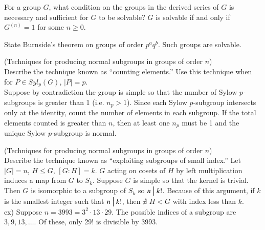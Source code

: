 \documentclass[avery5371,grid]{flashcards}
\newcommand{\divides}{\bigm|}
\begin{document}
\begin{flashcard}[Groups]{For a group $G$, what condition on the groups in the derived series of $G$ is necessary and sufficient for $G$ to be solvable?}
 $G$ is solvable if and only if $G^{(n)} = 1$ for some $n \geq 0$.
\end{flashcard}

\begin{flashcard}[Groups]{State Burnside's theorem on groups of order $p^aq^b$.}
 Such groups are solvable.
\end{flashcard}


\begin{flashcard}[Groups]{(Techniques for producing normal subgroups in groups of order $n$) \\ \vspace{5pt} Describe the technique known as ``counting elements.''}
 Use this technique when for $P \in Syl_p(G)$, $|P| = p$.\\
 
 Suppose by contradiction the group is simple so that the number of Sylow $p$-subgroups is greater than 1 (i.e. $n_p > 1$). Since each Sylow $p$-subgroup intersects only at the identity, count the number of elements in each subgroup. If the total elements counted is greater than $n$, then at least one $n_p$ must be 1 and the unique Sylow $p$-subgroup is normal.
\end{flashcard}

\begin{flashcard}[Groups]{(Techniques for producing normal subgroups in groups of order $n$) \\ \vspace{5pt} Describe the technique known as ``exploiting subgroups of small index.''}
 Let $|G| = n$, $H \leq G$, $[G:H] = k$. $G$ acting on cosets of $H$ by left multiplication induces a map from $G$ to $S_k$. Suppose $G$ is simple so that the kernel is trivial. Then $G$ is isomorphic to a subgroup of $S_k$ so $n \divides k!$. Because of this argument, if $k$ is the smallest integer such that $n \divides k!$, then $\nexists$ $H < G$ with index less than $k$.\\
 
 ex) Suppose $n = 3993 = 3^2 \cdot 13 \cdot 29$. The possible indices of a subgroup are $3, 9, 13, \ldots.$ Of these, only 29! is divisible by 3993.
\end{flashcard}
\end{document}
